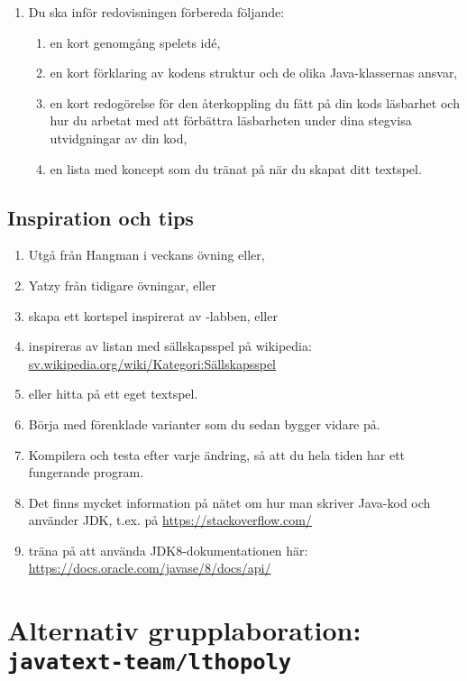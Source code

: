 \begin{enumerate}
  \item Du ska inför redovisningen förbereda följande:
  \begin{enumerate}
    \item en kort genomgång spelets idé,
    \item en kort förklaring av kodens struktur och de olika Java-klassernas ansvar,
    \item en kort redogörelse för den återkoppling du fått på din kods läsbarhet och hur du arbetat med att förbättra läsbarheten under dina stegvisa utvidgningar av din kod,
    \item en lista med koncept som du tränat på när du skapat ditt textspel.
  \end{enumerate}
\end{enumerate}

\subsection{Inspiration och tips}

\begin{enumerate}
  \item Utgå från Hangman i veckans övning eller,
  \item Yatzy från tidigare övningar, eller
  \item skapa ett kortspel inspirerat av -labben, eller
  \item inspireras av listan med sällskapsspel på wikipedia:\\ \href{https://sv.wikipedia.org/wiki/Kategori:Sällskapsspel}{sv.wikipedia.org/wiki/Kategori:Sällskapsspel}
  \item eller hitta på ett eget textspel.
  \item Börja med förenklade varianter som du sedan bygger vidare på.
  \item Kompilera och testa efter varje ändring, så att du hela tiden har ett fungerande program.
  \item Det finns mycket information på nätet om hur man skriver Java-kod och använder JDK, t.ex. på \url{https://stackoverflow.com/}
  \item träna på att använda JDK8-dokumentationen här:\\ \url{https://docs.oracle.com/javase/8/docs/api/}
\end{enumerate}


\clearpage
\section{Alternativ grupplaboration: \textnormal{\texttt{javatext-team/lthopoly}}}\label{section:alt:lthopoly}

